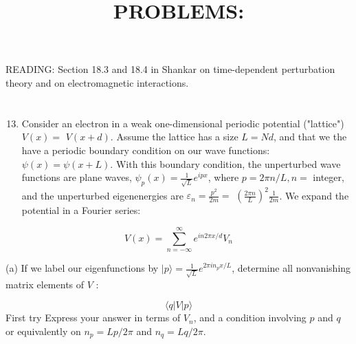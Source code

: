 \documentclass[12pt]{article}
\title{PROBLEMS: }
\author{}
\date{}
\begin{document}
\maketitle
READING: Section 18.3 and 18.4 in Shankar on time-dependent perturbation theory and on electromagnetic interactions.
\section{}
\begin{enumerate}
  \setcounter{enumi}{12}
  \item Consider an electron in a weak one-dimensional periodic potential ("lattice") $V(x)=$ $V(x+d)$. Assume the lattice has a size $L=N d$, and that we the have a periodic boundary condition on our wave functions: $\psi(x)=\psi(x+L)$. With this boundary condition, the unperturbed wave functions are plane waves, $\psi_{p}(x)=\frac{1}{\sqrt{L}} e^{i p x}$, where $p=2 \pi n / L, n=$ integer, and the unperturbed eigenenergies are $\varepsilon_{n}=\frac{p^{2}}{2 m}=$ $\left(\frac{2 \pi n}{L}\right)^{2} \frac{1}{2 m}$. We expand the potential in a Fourier series:
\end{enumerate}

$$
V(x)=\sum_{n=-\infty}^{\infty} e^{i n 2 \pi x / d} V_{n}
$$

(a) If we label our eigenfunctions by $|p\rangle=\frac{1}{\sqrt{L}} e^{2 \pi i n_{p} x / L}$, determine all nonvanishing matrix elements of $V$ :

$$
\langle q|V| p\rangle
$$First try
Express your answer in terms of $V_{n}$, and a condition involving $p$ and $q$ or equivalently on $n_{p}=L p / 2 \pi$ and $n_{q}=L q / 2 \pi$.
\end{document}
